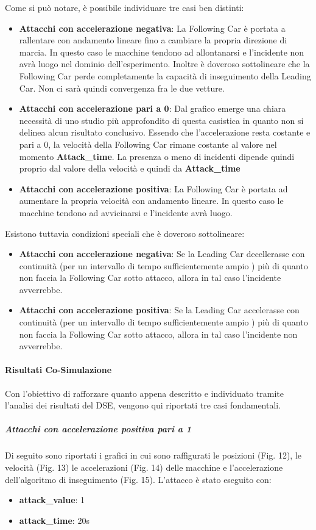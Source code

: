 Come si può notare, è possibile individuare tre casi ben distinti:
\begin{itemize}
	\item \textbf{Attacchi con accelerazione negativa}: La Following Car è portata a rallentare con andamento lineare fino a cambiare la propria direzione di marcia. In questo caso le macchine tendono ad allontanarsi e l'incidente non avrà luogo nel dominio dell'esperimento. Inoltre è doveroso sottolineare che la Following Car perde completamente la capacità di inseguimento della Leading Car. Non ci sarà quindi convergenza fra le due vetture.
	\item \textbf{Attacchi con accelerazione pari a 0}: Dal grafico emerge una chiara necessità di uno studio più approfondito di questa casistica in quanto non si delinea alcun risultato conclusivo. Essendo che l'accelerazione resta costante e pari a 0, la velocità della Following Car rimane costante al valore nel momento \textbf{Attack\_time}. La presenza o meno di incidenti dipende quindi proprio dal valore della velocità e quindi da \textbf{Attack\_time}
	\item \textbf{Attacchi con accelerazione positiva}: La Following Car è portata ad aumentare la propria velocità con andamento lineare. In questo caso le macchine tendono ad avvicinarsi e l'incidente avrà luogo.
\end{itemize}
Esistono tuttavia condizioni speciali che è doveroso sottolineare:
\begin{itemize}
	\item \textbf{Attacchi con accelerazione negativa}: Se la Leading Car decellerasse con continuità (per un intervallo di tempo sufficientemente ampio ) più di quanto non faccia la Following Car sotto attacco, allora in tal caso l'incidente avverrebbe.
	\item \textbf{Attacchi con accelerazione positiva}: Se la Leading Car accelerasse con continuità (per un intervallo di tempo sufficientemente ampio ) più di quanto non faccia la Following Car sotto attacco, allora in tal caso l'incidente non avverrebbe.
\end{itemize}
\paragraph{Risultati Co-Simulazione}
Con l'obiettivo di rafforzare quanto appena descritto  e individuato tramite l'analisi dei risultati del DSE, vengono qui riportati tre casi fondamentali.
\subparagraph{Attacchi con accelerazione positiva pari a 1} Di seguito sono riportati i grafici in cui sono raffigurati le posizioni (Fig. 12), le velocità (Fig. 13) le accelerazioni (Fig. 14) delle macchine e l'accelerazione dell'algoritmo di inseguimento (Fig. 15).
L'attacco è stato eseguito con:
\begin{itemize}
	\item \textbf{attack\_value}: 1
	\item \textbf{attack\_time}: 20s
\end{itemize}


